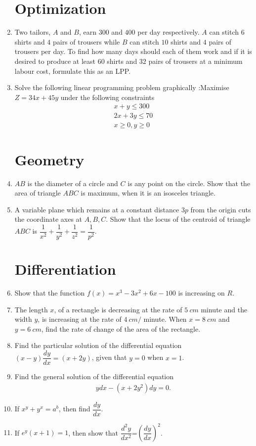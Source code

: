 \documentclass{article}
\providecommand{\brak}[1]{\ensuremath{\left(#1\right)}}
\begin{document}
\begin{enumerate}
\section{Optimization}
\item Two tailors, $A$ and $B$, earn \rupee$300$ and \rupee$400$ per day respectively. $A$ can stitch $6$ shirts and $4$ pairs of trousers while $B$ can stitch $10$ shirts and $4$ pairs of trousers per day. To find how many days should each of them work and if it is desired to produce at least $60$ shirts and $32$ pairs of trousers at a minimum labour cost, formulate this as an LPP.
\item Solve the following linear programming problem graphically :\newline Maximise $Z=34x+45y$ \newline under the following constraints
\begin{align*}
x+y \leq 300 \\
2 x+3 y \leq 70 \\
x \geq 0, y \geq 0
\end{align*}
\section{Geometry}
\item $AB$ is the diameter of a circle and $C$ is any point on the circle. Show that the area of triangle $ABC$ is maximum, when it is an isosceles triangle.
\item A variable plane which remains at a constant distance $3p$ from the origin cuts the coordinate axes at $A, B, C$. Show that the locus of the centroid of triangle $ABC$ is $\dfrac{1}{x^2}+\dfrac{1}{y^2}+\dfrac{1}{z^2}=\dfrac{1}{p^2}$.
\section{Differentiation}
\item Show that the function $f\brak{x}=x^3-3 x^2+6 x-100$ is increasing on $R$.
\item The length $x$, of a rectangle is decreasing at the rate of $5~cm$ minute and the width $y$, is increasing at the rate of $4~cm /$ minute. When $x=8~cm$ and $y=6~cm$, find the rate of change of the area of the rectangle.
\item Find the particular solution of the differential equation $\brak{x-y}\dfrac{dy}{dx}=\brak{x+2y}$, given that $y=0$ when $x=1$.
\item Find the general solution of the differential equation
\begin{align*}
  ydx-\brak{x+2 y^2}dy=0.  
\end{align*}
\item If $x^y+y^x=a^b$, then find $\dfrac{dy}{dx}$.
\item If $e^{y}\brak{x+1}=1$, then show that $\dfrac{d^2y}{dx^2}$=$\brak{\dfrac{dy}{dx}}^2$.

\end{enumerate}
\end{document}
